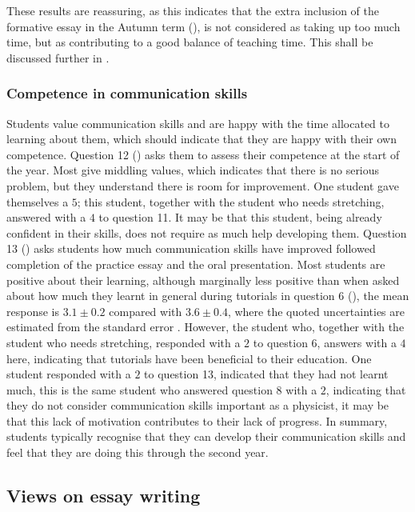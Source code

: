 These results are reassuring, as this indicates that the extra inclusion of the formative essay in the Autumn term (), is not considered as taking up too much time, but as contributing to a good balance of teaching time. This shall be discussed further in .

\subsubsection{Competence in communication skills}\label{sec:comm-level}

Students value communication skills and are happy with the time allocated to learning about them, which should indicate that they are happy with their own competence. Question 12 () asks them to assess their competence at the start of the year. Most give middling values, which indicates that there is no serious problem, but they understand there is room for improvement. One student gave themselves a $5$; this student, together with the student who needs stretching, answered with a $4$ to question 11. It may be that this student, being already confident in their skills, does not require as much help developing them. Question 13 () asks students how much communication skills have improved followed completion of the practice essay and the oral presentation. Most students are positive about their learning, although marginally less positive than when asked about how much they learnt in general during tutorials in question 6 (), the mean response is $3.1\pm0.2$ compared with $3.6\pm0.4$, where the quoted uncertainties are estimated from the standard error \citep[chapter 22]{Mackay2003}. However, the student who, together with the student who needs stretching, responded with a $2$ to question 6, answers with a $4$ here, indicating that tutorials have been beneficial to their education. One student responded with a $2$ to question 13, indicated that they had not learnt much, this is the same student who answered question 8 with a $2$, indicating that they do not consider communication skills important as a physicist, it may be that this lack of motivation contributes to their lack of progress. In summary, students typically recognise that they can develop their communication skills and feel that they are doing this through the second year.

\subsection{Views on essay writing}\label{sec:essay-results}


